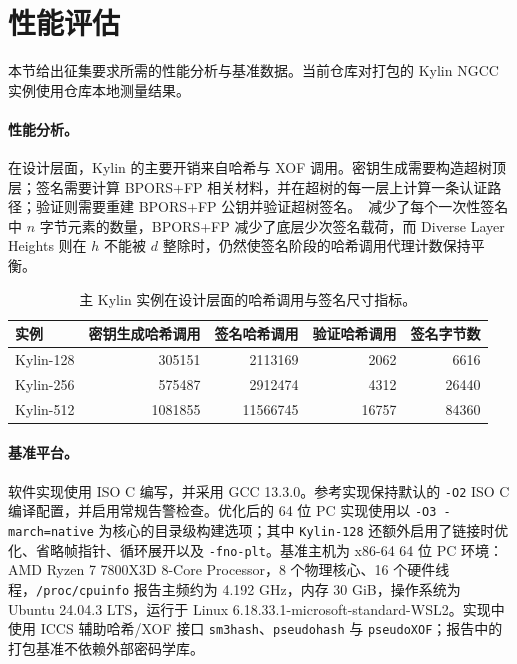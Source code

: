 \section{性能评估}
\label{sec:performance}

本节给出征集要求所需的性能分析与基准数据。当前仓库对打包的 Kylin NGCC 实例使用仓库本地测量结果。

\paragraph{性能分析。}
在设计层面，Kylin 的主要开销来自哈希与 XOF 调用。密钥生成需要构造超树顶层；签名需要计算 BPORS+FP 相关材料，并在超树的每一层上计算一条认证路径；验证则需要重建 BPORS+FP 公钥并验证超树签名。\WOTSCS\ 减少了每个一次性签名中 $n$ 字节元素的数量，BPORS+FP 减少了底层少次签名载荷，而 Diverse Layer Heights 则在 $h$ 不能被 $d$ 整除时，仍然使签名阶段的哈希调用代理计数保持平衡。

\begin{table}[H]
    \centering
    \caption{主 Kylin 实例在设计层面的哈希调用与签名尺寸指标。}
    \label{tab:kylin-hashcall-performance}
    \scriptsize
    \begin{tabular}{l r r r r}
    \toprule
    实例 & 密钥生成哈希调用 & 签名哈希调用 & 验证哈希调用 & 签名字节数 \\ \midrule
    Kylin-128 & 305151 & 2113169 & 2062 & 6616 \\
    Kylin-256 & 575487 & 2912474 & 4312 & 26440 \\
    Kylin-512 & 1081855 & 11566745 & 16757 & 84360 \\
    \bottomrule
    \end{tabular}
\end{table}

\paragraph{基准平台。}
软件实现使用 ISO C 编写，并采用 GCC 13.3.0。参考实现保持默认的 \texttt{-O2} ISO C 编译配置，并启用常规告警检查。优化后的 64 位 PC 实现使用以 \texttt{-O3 -march=native} 为核心的目录级构建选项；其中 \texttt{Kylin-128} 还额外启用了链接时优化、省略帧指针、循环展开以及 \texttt{-fno-plt}。基准主机为 x86-64 64 位 PC 环境：AMD Ryzen 7 7800X3D 8-Core Processor，8 个物理核心、16 个硬件线程，\texttt{/proc/cpuinfo} 报告主频约为 4.192 GHz，内存 30 GiB，操作系统为 Ubuntu 24.04.3 LTS，运行于 Linux 6.18.33.1-microsoft-standard-WSL2。实现中使用 ICCS 辅助哈希/XOF 接口 \texttt{sm3hash}、\texttt{pseudohash} 与 \texttt{pseudoXOF}；报告中的打包基准不依赖外部密码学库。

